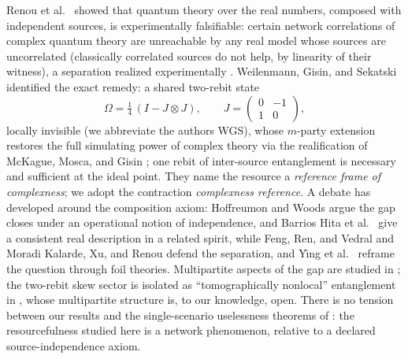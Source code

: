\documentclass[11pt]{article}
\theoremstyle{plain}
\theoremstyle{definition}
\theoremstyle{remark}
\theoremstyle{plain}
\newcommand{\Om}{\Omega}
\begin{document}
Renou et al.\ \cite{renou2021} showed that quantum theory over the
real numbers, composed with independent sources, is experimentally
falsifiable: certain network correlations of complex quantum
theory are unreachable by any real model whose sources are
uncorrelated (classically correlated sources do not help, by
linearity of their witness), a separation realized experimentally
\cite{li2022,chen2022}. Weilenmann, Gisin, and Sekatski
\cite{wgs2025} identified the exact remedy: a shared two-rebit
state
\[
\Om = \tfrac14\,(I - J\otimes J),
\qquad
J = \begin{pmatrix}0&-1\\1&0\end{pmatrix},
\]
locally invisible (we abbreviate the authors WGS), whose
$m$-party extension restores the full
simulating power of complex theory via the realification of
McKague, Mosca, and Gisin \cite{mckague2009}; one rebit of
inter-source entanglement is necessary and sufficient at the ideal
point. They name the resource a \emph{reference frame of
complexness}; we adopt the contraction \emph{complexness
reference}. A debate has developed around the composition axiom:
Hoffreumon and Woods \cite{hoffreumon2025,hoffreumon2026} argue
the gap closes under an operational notion of independence, and
Barrios Hita et al.\ \cite{barrios2026} give a consistent real
description in a related spirit, while Feng, Ren, and Vedral
\cite{feng2025} and Moradi Kalarde, Xu, and Renou
\cite{kalarde2026} defend the separation, and Y\={\i}ng et al.\
\cite{ying2025} reframe the question through foil theories.
Multipartite aspects of the gap are studied in \cite{sarkar2025};
the two-rebit skew sector is isolated as ``tomographically
nonlocal'' entanglement in \cite{baldijao2026}, whose multipartite
structure is, to our knowledge, open. There is no tension between
our results and the single-scenario uselessness theorems of
\cite{baldijao2026}: the resourcefulness studied here is a network
phenomenon, relative to a declared source-independence axiom.
\end{document}
